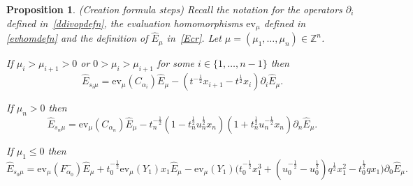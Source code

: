 \documentclass[11pt]{article}
\theoremstyle{plain}
\newtheorem{prop}[thm]{Proposition}
\theoremstyle{definition}
\theoremstyle{remark}
\numberwithin{equation}{section}
\def\ZZ{\mathbb{Z}}
\def\ev{\mathrm{ev}}
\newcounter{r}
\newcounter{s}
\begin{document}
\begin{prop} \label{cformsteps}
(Creation formula steps)
Recall the notation for the operators  $\partial_i$ defined in~\eqref{ddivopdefn}, the evaluation homomorphisms $\ev_\mu$ defined in 
\eqref{evhomdefn} and the definition of $\widehat{E}_\mu$ in~\eqref{Ecr}.  Let $\mu = (\mu_1, \ldots, \mu_n)\in \ZZ^n$.
\item[(a)]
If $\mu_i > \mu_{i+1} > 0$ or $0 > \mu_i > \mu_{i+1}$ for some $i\in \{1,\ldots, n-1\}$ then\quad
$$\widehat{E}_{s_i\mu} = \ev_\mu(C_{\alpha_i})\widehat{E}_\mu 
- (t^{-\frac12} x_{i+1}-t^{\frac12} x_i)\partial_i \widehat{E}_\mu.
$$
\item[(b)]
If $\mu_n>0$ then\quad
$$\widehat{E}_{s_n\mu} = \ev_\mu(C_{\alpha_n}) \widehat{E}_\mu
- t_n^{-\frac12} (1-t_n^{\frac12}u_n^{\frac12}x_n)(1+t_n^{\frac12}u_n^{-\frac12}x_n)\partial_n \widehat{E}_\mu.
$$
\item[(c)]
If $\mu_1\le 0$ then 
$$
\widehat{E}_{s_0\mu} =
\ev_\mu(F^-_{\alpha_0})\widehat{E}_\mu  + t_0^{-\frac12} \ev_\mu(Y_1) x_1 \widehat{E}_\mu -
\ev_\mu(Y_1)
\big(t_0^{-\frac12} x_{1}^{3} + 
(u_0^{-\frac12} - u_0^{\frac12}) q^{\frac12}x_{1}^{2} - t_0^{\frac12} q x_1\big) \partial_{0}\widehat{E}_\mu.
$$
\end{prop}
\end{document}
